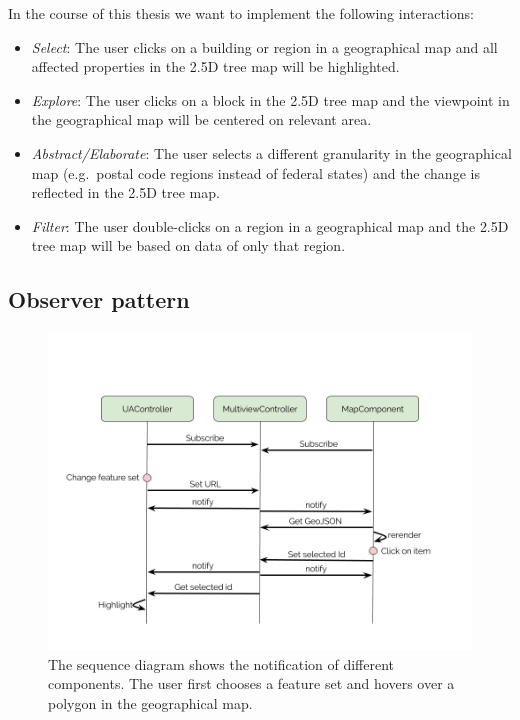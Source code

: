 \documentclass{article}
\newcommand{\tmap}{\textsc{2.5D} tree map}
\begin{document}
In the course of this thesis we want to implement the following interactions:
\begin{itemize}
  \item
    \emph{Select}: The user clicks on a building or region in a geographical map and all affected properties in the \tmap{} will be highlighted.
  \item
    \emph{Explore}: The user clicks on a block in the \tmap{} and the viewpoint in the geographical map will be centered on relevant area.
  \item
    \emph{Abstract/Elaborate}: The user selects a different granularity in the geographical map (e.g.\ postal code regions instead of federal states) and the change is reflected in the \tmap{}.
  \item
    \emph{Filter}: The user double-clicks on a region in a geographical map and the \tmap{} will be based on data of only that region.
\end{itemize}

\subsection{Observer pattern}
\begin{figure}[h!]
  \centering
  \includegraphics[width=\textwidth]{images/sequence-diagram.png}
  \caption{%
    The sequence diagram shows the notification of different components.
  The user first chooses a feature set and hovers over a polygon in the geographical map.
  }\label{fig:implementation:sequence-diagram}
\end{figure}
\end{document}
